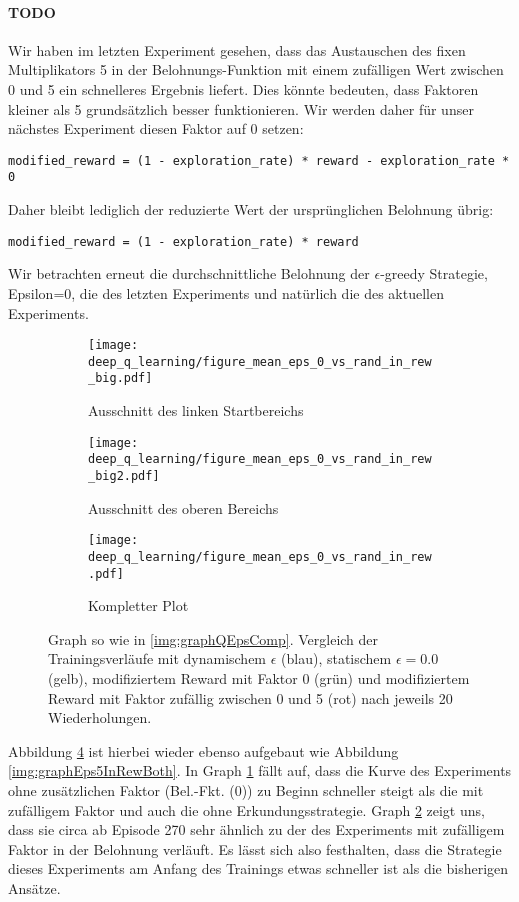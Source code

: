 \paragraph{TODO}
Wir haben im letzten Experiment gesehen, dass das Austauschen des fixen Multiplikators 5 in der Belohnungs-Funktion mit einem zufälligen Wert zwischen 0 und 5 ein schnelleres Ergebnis liefert. Dies könnte bedeuten, dass Faktoren kleiner als 5 grundsätzlich besser funktionieren. Wir werden daher für unser nächstes Experiment diesen Faktor auf 0 setzen:
\begin{verbatim}
modified_reward = (1 - exploration_rate) * reward - exploration_rate * 0
\end{verbatim}
Daher bleibt lediglich der reduzierte Wert der ursprünglichen Belohnung übrig:
\begin{verbatim}
modified_reward = (1 - exploration_rate) * reward
\end{verbatim}
Wir betrachten erneut die durchschnittliche Belohnung der $ \epsilon $-greedy Strategie, Epsilon=0, die des letzten Experiments und natürlich die des aktuellen Experiments.
\begin{figure}[h!]
    \centering
    \begin{subfigure}[b]{0.49\textwidth}
        \texttt{[image: deep\_q\_learning/figure\_mean\_eps\_0\_vs\_rand\_in\_rew\_big.pdf]}
        \caption{Ausschnitt des linken Startbereichs}
        \label{img:graphEps0VsRandInRewBig}
    \end{subfigure}
    \begin{subfigure}[b]{0.49\textwidth}
        \texttt{[image: deep\_q\_learning/figure\_mean\_eps\_0\_vs\_rand\_in\_rew\_big2.pdf]}
        \caption{Ausschnitt des oberen Bereichs}
        \label{img:graphEps0VsRandInRewBig2}
    \end{subfigure}
    \begin{subfigure}[b]{0.7\textwidth}
        \texttt{[image: deep\_q\_learning/figure\_mean\_eps\_0\_vs\_rand\_in\_rew.pdf]}
        \caption{Kompletter Plot}
        \label{img:graphEps0VsRandInRew}
    \end{subfigure}
    \caption{Graph so wie in \ref{img:graphQEpsComp}. Vergleich der Trainingsverläufe mit dynamischem $ \epsilon $ (blau), statischem $ \epsilon = 0.0 $ (gelb), modifiziertem Reward mit Faktor 0 (grün) und modifiziertem Reward mit Faktor zufällig zwischen 0 und 5 (rot) nach jeweils 20 Wiederholungen.}
    \label{img:graphEps0VsRandInRewBoth}
\end{figure}
Abbildung \ref{img:graphEps0VsRandInRewBoth} ist hierbei wieder ebenso aufgebaut wie Abbildung \ref{img:graphEps5InRewBoth}. In Graph \ref{img:graphEps0VsRandInRewBig} fällt auf, dass die Kurve des Experiments ohne zusätzlichen Faktor (Bel.-Fkt. (0)) zu Beginn schneller steigt als die mit zufälligem Faktor und auch die ohne Erkundungsstrategie. Graph \ref{img:graphEps0VsRandInRewBig2} zeigt uns, dass sie circa ab Episode 270 sehr ähnlich zu der des Experiments mit zufälligem Faktor in der Belohnung verläuft. Es lässt sich also festhalten, dass die Strategie dieses Experiments am Anfang des Trainings etwas schneller ist als die bisherigen Ansätze.

